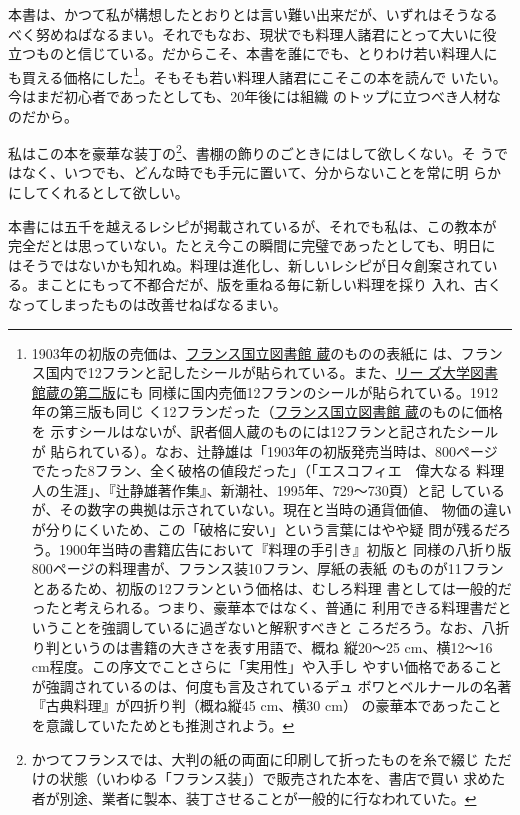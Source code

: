 本書は、かつて私が構想したとおりとは言い難い出来だが、いずれはそうなる
べく努めねばなるまい。それでもなお、現状でも料理人諸君にとって大いに役
立つものと信じている。だからこそ、本書を誰にでも、とりわけ若い料理人に
も買える価格にした\footnote{1903年の初版の売価は、\href{http://gallica.bnf.fr/ark:/12148/bpt6k65768837}{フランス国立図書館
  蔵}のものの表紙に
  は、フランス国内で12フランと記したシールが貼られている。また、\href{https://archive.org/details/b21525912}{リー
  ズ大学図書館蔵の第二版}にも
  同様に国内売価12フランのシールが貼られている。1912年の第三版も同じ
  く12フランだった（\href{http://gallica.bnf.fr/ark:/12148/bpt6k96923116}{フランス国立図書館
  蔵}のものに価格を
  示すシールはないが、訳者個人蔵のものには12フランと記されたシールが
  貼られている）。なお、辻静雄は「1903年の初版発売当時は、800ページ
  でたった8フラン、全く破格の値段だった」（「エスコフィエ　偉大なる
  料理人の生涯」、『辻静雄著作集』、新潮社、1995年、729〜730頁）と記
  しているが、その数字の典拠は示されていない。現在と当時の通貨価値、
  物価の違いが分りにくいため、この「破格に安い」という言葉にはやや疑
  問が残るだろう。1900年当時の書籍広告において『料理の手引き』初版と
  同様の八折り版800ページの料理書が、フランス装10フラン、厚紙の表紙
  のものが11フランとあるため、初版の12フランという価格は、むしろ料理
  書としては一般的だったと考えられる。つまり、豪華本ではなく、普通に
  利用できる料理書だということを強調しているに過ぎないと解釈すべきと
  ころだろう。なお、八折り判というのは書籍の大きさを表す用語で、概ね
  縦20〜25 cm、横12〜16 cm程度。この序文でことさらに「実用性」や入手し
  やすい価格であることが強調されているのは、何度も言及されているデュ
  ボワとベルナールの名著『古典料理』が四折り判（概ね縦45 cm、横30 cm）
  の豪華本であったことを意識していたためとも推測されよう。}。そもそも若い料理人諸君にこそこの本を読んで
いたい。今はまだ初心者であったとしても、20年後には組織
のトップに立つべき人材なのだから。

私はこの本を豪華な装丁の\footnote{かつてフランスでは、大判の紙の両面に印刷して折ったものを糸で綴じ
  ただけの状態（いわゆる「フランス装」）で販売された本を、書店で買い
  求めた者が別途、業者に製本、装丁させることが一般的に行なわれていた。}、書棚の飾りのごときにはして欲しくない。そ
うではなく、いつでも、どんな時でも手元に置いて、分からないことを常に明
らかにしてくれるとして欲しい。

本書には五千を越えるレシピが掲載されているが、それでも私は、この教本が
完全だとは思っていない。たとえ今この瞬間に完璧であったとしても、明日に
はそうではないかも知れぬ。料理は進化し、新しいレシピが日々創案されてい
る。まことにもって不都合だが、版を重ねる毎に新しい料理を採り
入れ、古くなってしまったものは改善せねばなるまい。

